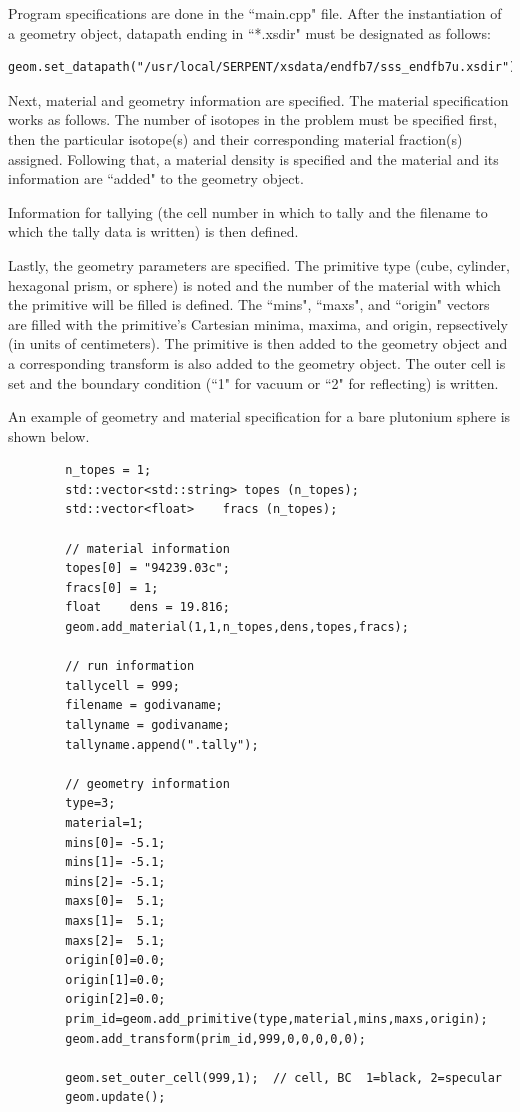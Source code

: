 \documentclass[twoside,a4paper]{refart}
\begin{document}
Program specifications are done in the ``main.cpp" file. After the instantiation of a geometry object, 
datapath ending in ``*.xsdir" must be designated as follows:

\begin{verbatim}
geom.set_datapath("/usr/local/SERPENT/xsdata/endfb7/sss_endfb7u.xsdir");
\end{verbatim}

Next, material and geometry information are specified. The material specification works as follows. The 
number of isotopes in the problem must be specified first, then the particular isotope(s) and their 
corresponding material fraction(s) assigned. Following that, a material density is specified and the 
material and its information are ``added" to the geometry object.

Information for tallying (the cell number in which to tally and the filename to which the tally data is written) is then defined.

Lastly, the geometry parameters are specified. The primitive type (cube, cylinder, hexagonal prism, or sphere) is noted and the number of the material with which the primitive will be filled is defined. The 
``mins", ``maxs", and ``origin" vectors are filled with the primitive's Cartesian minima, maxima, and origin, repsectively (in units of centimeters). The primitive is then added to the geometry object and a corresponding transform is also added to the geometry object. The outer cell is set and the boundary
condition (``1" for vacuum or ``2" for reflecting) is written.

An example of geometry and material specification for a bare plutonium sphere is shown below.

\begin{verbatim}
		n_topes = 1;
		std::vector<std::string> topes (n_topes);
		std::vector<float>    fracs (n_topes);

		// material information
		topes[0] = "94239.03c";
		fracs[0] = 1;      
		float    dens = 19.816;
		geom.add_material(1,1,n_topes,dens,topes,fracs);
		
		// run information
		tallycell = 999;
		filename = godivaname;
		tallyname = godivaname;
		tallyname.append(".tally");
	
		// geometry information
		type=3;
		material=1;
		mins[0]= -5.1;
		mins[1]= -5.1;
		mins[2]= -5.1;
		maxs[0]=  5.1;
		maxs[1]=  5.1;
		maxs[2]=  5.1;
		origin[0]=0.0;
		origin[1]=0.0;
		origin[2]=0.0;
		prim_id=geom.add_primitive(type,material,mins,maxs,origin);
		geom.add_transform(prim_id,999,0,0,0,0,0);

		geom.set_outer_cell(999,1);  // cell, BC  1=black, 2=specular
		geom.update();
\end{verbatim}
\end{document}

